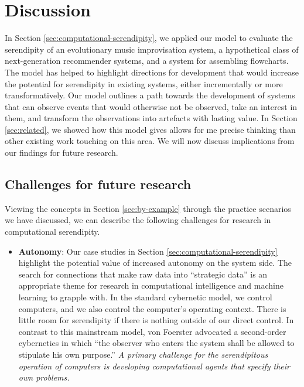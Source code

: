 
\section{Discussion} \label{sec:discussion}

In Section \ref{sec:computational-serendipity}, we applied our model
to evaluate the serendipity of an evolutionary music improvisation
system, a hypothetical class of next-generation recommender systems,
and a system for assembling flowcharts.  The model has helped to
highlight directions for development that would increase the potential
for serendipity in existing systems, either incrementally or more
transformatively.  Our model outlines a path towards the development
of systems that can observe events that would otherwise not be
observed, take an interest in them, and transform the observations
into artefacts with lasting value.  In Section \ref{sec:related}, we
showed how this model gives allows for me precise thinking than other
existing work touching on this area.  We will now discuss implications
from our findings for future research.

%
%
%

\subsection{Challenges for future research} \label{sec:recommendations}

Viewing the concepts in Section \ref{sec:by-example} through the
practice scenarios we have discussed, we can describe the following
challenges for research in computational serendipity.

\begin{itemize}
\item \textbf{Autonomy}: Our case studies in Section
  \ref{sec:computational-serendipity} highlight the potential value of
  increased autonomy on the system side.
The search for connections that make raw data into ``strategic data''
is an appropriate theme for research in computational intelligence and
machine learning to grapple with.  In the standard cybernetic model,
we control computers, and we also control the computer's operating
context.  There is little room for serendipity if there is nothing
outside of our direct control.  In contrast to this mainstream model,
von Foerster \citeyear[p. 286]{von2003cybernetics} advocated a
second-order cybernetics in which ``the observer who enters the system
shall be allowed to stipulate his own purpose.''  \emph{A
  primary challenge for the serendipitous operation of computers is
  developing computational agents that specify their own problems.}
\end{itemize}

